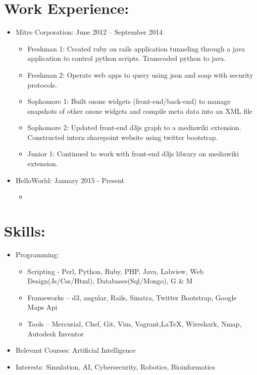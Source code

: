 \documentclass{res}
\begin{document}
\section{Work Experience:}
\begin{itemize}
\item Mitre Corporation: \hspace{45pt} June 2012 – September 2014
\begin{itemize}[label=$\circ$]
\item Freshman 1: Created ruby on rails application tunneling through a java application to control python scripts. Transcoded python to java.
\item Freshman 2: Operate web apps to query using json and soap with security protocols.
\item Sophomore 1: Built ozone widgets (front-end/back-end) to manage snapshots of other ozone widgets and compile meta data into an XML file
\item Sophomore 2: Updated front-end d3js graph to a mediawiki extension. Constructed intern sharepoint website using twitter bootstrap.
\item Junior 1: Continued to work with front-end d3js library on mediawiki extension.
\end{itemize}
\item HelloWorld: \hspace{45pt} January 2015 - Present
\begin{itemize}[label=$\circ$]
\item
\end{itemize}
\end{itemize}

\section{Skills:}
\begin{itemize}
\item Programming:
\begin{itemize}[label=$\circ$]
\item Scripting - Perl, Python, Ruby, PHP, Java, Labview, Web Design(Js/Css/Html), Databases(Sql/Mongo), G \& M
\item Frameworks – d3, angular, Rails, Sinatra, Twitter Bootstrap, Google Maps Api
\item Tools – Mercurial, Chef, Git, Vim, Vagrant,\LaTeX, Wireshark, Nmap, Autodesk Inventor %
\end{itemize}
\item Relevant Courses: Artificial Intelligence
\item Interests: Simulation, AI, Cybersecurity, Robotics, Bioinformatics
\end{itemize}
\end{document}
